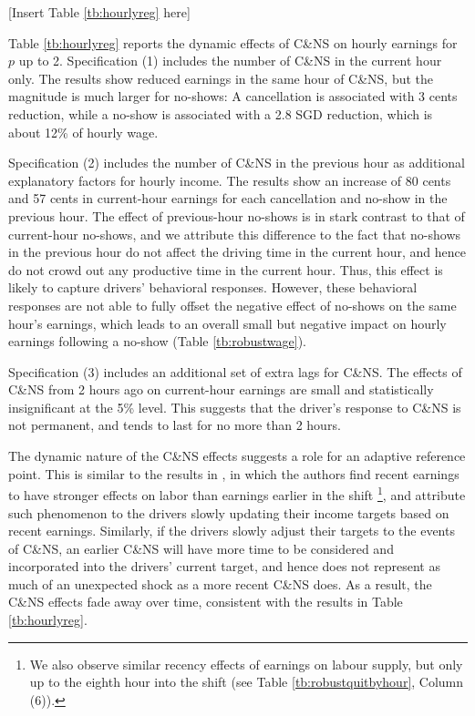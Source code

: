 \documentclass[reviewmode]{restat}
\begin{document}
\begin{center}
	[Insert Table \ref{tb:hourlyreg} here]
\end{center}

Table \ref{tb:hourlyreg} reports the dynamic effects of C\&NS on hourly earnings for $p$ up to 2. 
Specification (1) includes the number of C\&NS in the current hour only. The results show reduced 
earnings in the same hour of C\&NS, but the magnitude is much larger for no-shows: A cancellation is 
associated with 3 cents reduction, while a no-show is associated with a 2.8 SGD reduction, which is 
about 12\% of hourly wage. 

Specification (2) includes the number of C\&NS in the previous hour as additional explanatory factors 
for hourly income. The results show an increase of 80 cents and 57 cents in current-hour earnings for 
each cancellation and no-show in the previous hour. The effect of previous-hour no-shows is in stark
contrast to that of current-hour no-shows, and we attribute this difference to the fact that no-shows 
in the previous hour do not affect the driving time in the current hour, and hence do not crowd out any
productive time in the current hour. Thus, this effect is likely to capture drivers' behavioral responses. 
However, these behavioral responses are not able to fully offset the negative effect of no-shows on the
same hour's earnings, which leads to an overall small but negative impact on hourly earnings following
a no-show (Table \ref{tb:robustwage}).

Specification (3) includes an additional set of extra lags for C\&NS. The effects of C\&NS from 2 hours
ago on current-hour earnings are small and statistically insignificant at the 5\% level. This suggests
that the driver's response to C\&NS is not permanent, and tends to last for no more than 2 hours. 

The dynamic nature of the C\&NS effects suggests a role for an adaptive reference point. 
This is similar to the results in \citet{thakral2018daily}, in which the authors find recent
earnings to have stronger effects on labor than earnings earlier in the shift%
\footnote{We also observe similar recency effects of earnings on labour supply, 
but only up to the eighth hour into the shift (see Table \ref{tb:robustquitbyhour}, Column (6)).},
and attribute such phenomenon to the drivers slowly updating their income targets based on recent earnings.
Similarly, if the drivers slowly adjust their targets to the events of C\&NS, an earlier C\&NS will have
more time to be considered and incorporated into the drivers' current target, and hence does not represent
as much of an unexpected shock as a more recent C\&NS does. As a result, the C\&NS effects fade away over
time, consistent with the results in Table \ref{tb:hourlyreg}.
\end{document}
